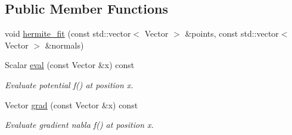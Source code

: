 \subsection*{Public Member Functions}
\begin{DoxyCompactItemize}
\item 
void \hyperlink{classHRBF__fit_a6eaa6526a09baebf2ea7f627d396a47a}{hermite\+\_\+fit} (const std\+::vector$<$ Vector $>$ \&points, const std\+::vector$<$ Vector $>$ \&normals)
\item 
Scalar \hyperlink{classHRBF__fit_af1db985505c2bda3c4593d05b87f4e05}{eval} (const Vector \&x) const \hypertarget{classHRBF__fit_af1db985505c2bda3c4593d05b87f4e05}{}\label{classHRBF__fit_af1db985505c2bda3c4593d05b87f4e05}

\begin{DoxyCompactList}\small\item\em Evaluate potential f() at position \textquotesingle{}x\textquotesingle{}. \end{DoxyCompactList}\item 
Vector \hyperlink{classHRBF__fit_adb496c6d20f791517c67981f380020b6}{grad} (const Vector \&x) const \hypertarget{classHRBF__fit_adb496c6d20f791517c67981f380020b6}{}\label{classHRBF__fit_adb496c6d20f791517c67981f380020b6}

\begin{DoxyCompactList}\small\item\em Evaluate gradient nabla f() at position \textquotesingle{}x\textquotesingle{}. \end{DoxyCompactList}\end{DoxyCompactItemize}
